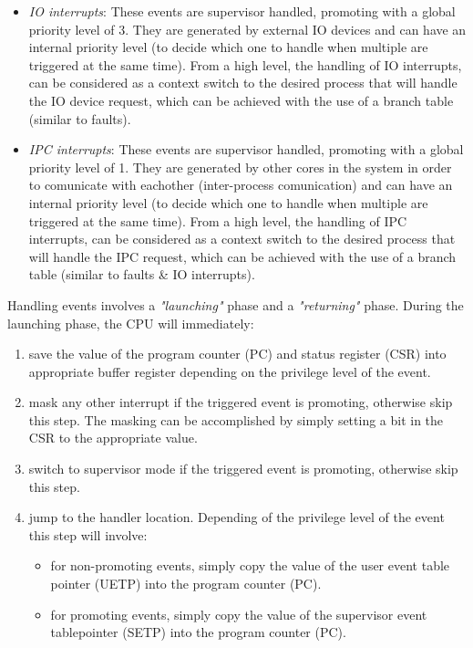 \documentclass{article}
\begin{document}
\begin{itemize}
\begin{itemize}
                \item \textit{IO interrupts}: These events are supervisor handled, promoting with a global priority level of 3. They are generated by external IO devices and can have an internal priority level (to decide which one to handle when multiple are triggered at the same time). From a high level, the handling of IO interrupts, can be considered as a context switch to the desired process that will handle the IO device request, which can be achieved with the use of a branch table (similar to faults).
                \item \textit{IPC interrupts}: These events are supervisor handled, promoting with a global priority level of 1. They are generated by other cores in the system in order to comunicate with eachother (inter-process comunication) and can have an internal priority level (to decide which one to handle when multiple are triggered at the same time). From a high level, the handling of IPC interrupts, can be considered as a context switch to the desired process that will handle the IPC request, which can be achieved with the use of a branch table (similar to faults & IO interrupts).

            \end{itemize}

        \end{itemize}

        Handling events involves a \textit{"launching"} phase and a \textit{"returning"} phase. During the launching phase, the CPU will immediately:

        \begin{enumerate}

            \item save the value of the program counter (PC) and status register (CSR) into appropriate buffer register depending on the privilege level of the event.
            \item mask any other interrupt if the triggered event is promoting, otherwise skip this step. The masking can be accomplished by simply setting a bit in the CSR to the appropriate value.
            \item switch to supervisor mode if the triggered event is promoting, otherwise skip this step.
            \item jump to the handler location. Depending of the privilege level of the event this step will involve:

                \begin{itemize}

                    \item for non-promoting events, simply copy the value of the user event table pointer (UETP) into the program counter (PC).
                    \item for promoting events, simply copy the value of the supervisor event tablepointer (SETP) into the program counter (PC).

                \end{itemize}

        \end{enumerate}
\end{document}
